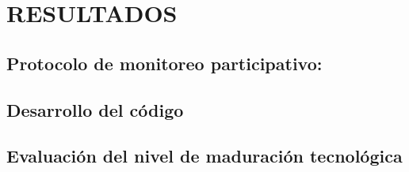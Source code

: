 \chapter{RESULTADOS}

\section{Protocolo de monitoreo participativo:}

\section{Desarrollo del código}
 

\section{Evaluación del nivel de maduración tecnológica}














